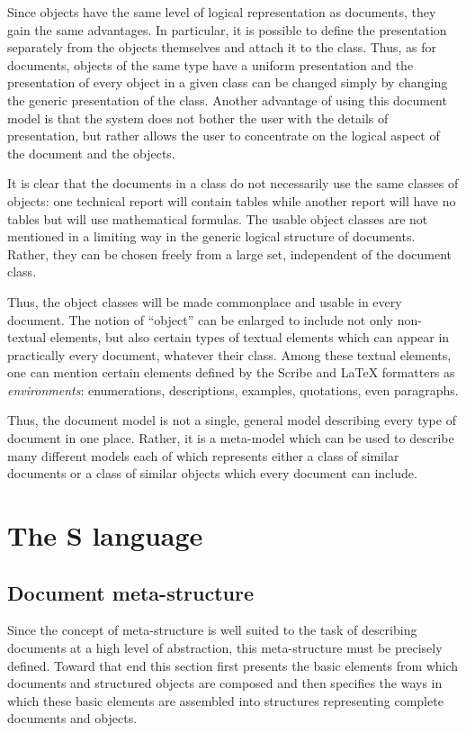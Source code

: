 Since objects have the same level of logical representation as
documents, they gain the same advantages.  In particular, it is
possible to define the presentation separately from the objects
themselves and attach it to the class.  Thus, as for documents,
objects of the same type have a uniform presentation and the
presentation of every object in a given class can be changed simply by
changing the generic presentation of the class.  Another advantage of
using this document model is that the system does not bother the user
with the details of presentation, but rather allows the user to
concentrate on the logical aspect of the document and the objects.

It is clear that the documents in a class do not necessarily use the
same classes of objects: one technical report will contain tables while
another report will have no tables but will use mathematical formulas.
The usable object classes are not mentioned in a limiting way in the
generic logical structure of documents.  Rather, they can be chosen
freely from a large set, independent of the document class.

Thus, the object classes will be made commonplace and usable in every
document. The notion of ``object'' can be enlarged to include not only
non-textual elements, but also certain types of textual elements which
can appear in practically every document, whatever their class.  Among
these textual elements, one can mention certain elements defined by
the Scribe and {\LaTeX} formatters as {\em environments}:
enumerations, descriptions, examples, quotations, even paragraphs.

Thus, the document model is not a single, general model describing
every type of document in one place.  Rather, it is a meta-model which
can be used to describe many different models each of which represents
either a class of similar documents or a class of similar objects
which every document can include.

\chapter{The S language}
\section{Document meta-structure}

Since the concept of meta-structure is well suited to the task of
describing documents at a high level of abstraction, this
meta-structure must be precisely defined.  Toward that end this
section first presents the basic elements from which documents and
structured objects are composed and then specifies the ways in which
these basic elements are assembled into structures representing
complete documents and objects.

